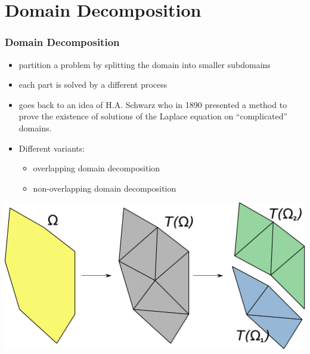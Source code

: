\documentclass[aspectratio=169,11pt]{beamer}
\theoremstyle{definition}
\begin{document}
\section{Domain Decomposition}
\begin{frame}
  \frametitle<presentation>{Domain Decomposition}

  \begin{itemize}
  \item partition a problem by splitting the domain into smaller subdomains
  \item each part is solved by a different process
  \item goes back to an idea of H.A. Schwarz who in 1890 presented a method to prove the existence of
        solutions of the Laplace equation on ``complicated'' domains.
  \item Different variants:
    \begin{itemize}
    \item overlapping domain decomposition
    \item non-overlapping domain decomposition
    \end{itemize}
  \end{itemize}

  \begin{center}
    \includegraphics[width=.6\linewidth]{dd}
  \end{center}

\end{frame}
\end{document}
